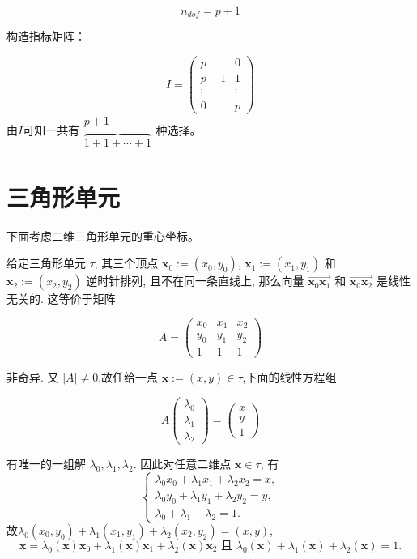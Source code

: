 \documentclass[12pt,a4paper]{article}
\begin{document}
$$
n_{dof} = {p+1}
$$

构造指标矩阵：

$$
I = \begin{pmatrix}
p  & 0 \\ p-1 & 1 \\ \vdots & \vdots \\ 0 & p 
\end{pmatrix}
$$
由$I$可知一共有$\begin{matrix} p+1 \\ \overbrace{ 1+1+\cdots+1 }
\end{matrix}$种选择。

\section{三角形单元}
下面考虑二维三角形单元的重心坐标。

给定三角形单元 $\tau$, 其三个顶点 $\mathbf x_0 :=(x_0,y_0)$, $\mathbf x_1 :=(x_1,y_1)$ 和 $\mathbf x_2 :=(x_2,y_2)$ 逆时针排列, 且不在同一条直线上, 那么向量 $\overrightarrow{\mathbf x_0\mathbf x_1}$ 和 $\overrightarrow{\mathbf x_0\mathbf x_2}$ 是线性无关的. 这等价于矩阵

$$
A = 
\begin{pmatrix}
x_0 & x_1 & x_2 \\
y_0 & y_1 & y_2 \\
1   & 1   & 1 
\end{pmatrix}
$$

非奇异. 
又 $|A|\ne 0$,故任给一点 $\mathbf{x}:=(x,y)\in\tau$,下面的线性方程组

$$
A 
\begin{pmatrix}
\lambda_0 \\
\lambda_1\\
\lambda_2  
\end{pmatrix}
=\begin{pmatrix}
x \\
y\\
1  
\end{pmatrix}
$$

有唯一的一组解 $\lambda_0,\lambda_1,\lambda_2$. 
因此对任意二维点 $\mathbf{x}\in\tau$, 有
$$
\begin{cases}
\lambda _0 x_0+\lambda _1 x_1+\lambda _2 x_2=x,\\
\lambda _0 y_0+\lambda _1 y_1+\lambda _2 y_2=y,\\
\lambda _0+ \lambda _1 +\lambda _2 =1.
\end{cases}
$$
故$\lambda _0 (x_0,y_0)+\lambda _1 (x_1,y_1)+\lambda _2 (x_2,y_2)=(x,y)$,
$$
\mathbf{x}=\lambda_0(\mathbf{x})\mathbf{x}_0 + \lambda_1(\mathbf{x})\mathbf{x}_1 + \lambda_2(\mathbf{x})\mathbf{x}_2 
\text{ 且 } \lambda_0(\mathbf{x}) + \lambda_1(\mathbf{x}) + \lambda_2(\mathbf{x}) = 1. 
$$
\end{document}
